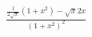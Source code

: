 \documentclass[preview]{standalone}
\begin{document}
$\frac{\frac{1}{2\sqrt{x}}\left(1+x^{2}\right)-\sqrt{x}2x}{\left(1+x^{2}\right)^{2}}$
\end{document}

